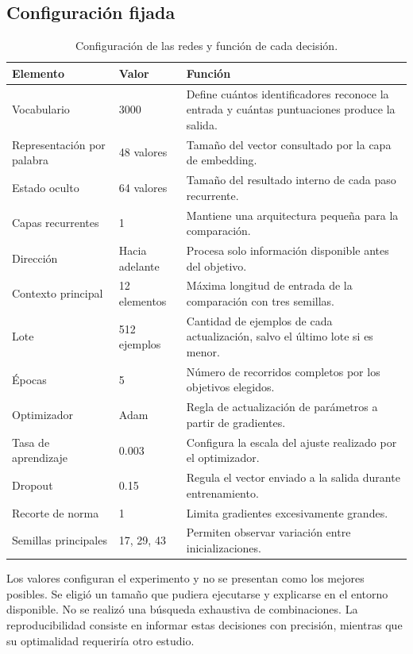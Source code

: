 \subsection{Configuración fijada}
\begin{table}[tb]
\caption{Configuración de las redes y función de cada decisión.}
\centering
\begin{tabular}{p{}p{}p{}}
\toprule Elemento & Valor & Función\\\midrule
Vocabulario & 3000 & Define cuántos identificadores reconoce la entrada y cuántas puntuaciones produce la salida.\\
Representación por palabra & 48 valores & Tamaño del vector consultado por la capa de embedding.\\
Estado oculto & 64 valores & Tamaño del resultado interno de cada paso recurrente.\\
Capas recurrentes & 1 & Mantiene una arquitectura pequeña para la comparación.\\
Dirección & Hacia adelante & Procesa solo información disponible antes del objetivo.\\
Contexto principal & 12 elementos & Máxima longitud de entrada de la comparación con tres semillas.\\
Lote & 512 ejemplos & Cantidad de ejemplos de cada actualización, salvo el último lote si es menor.\\
Épocas & 5 & Número de recorridos completos por los objetivos elegidos.\\
Optimizador & Adam & Regla de actualización de parámetros a partir de gradientes.\\
Tasa de aprendizaje & 0.003 & Configura la escala del ajuste realizado por el optimizador.\\
Dropout & 0.15 & Regula el vector enviado a la salida durante entrenamiento.\\
Recorte de norma & 1 & Limita gradientes excesivamente grandes.\\
Semillas principales & 17, 29, 43 & Permiten observar variación entre inicializaciones.\\\bottomrule
\end{tabular}
\end{table}

Los valores configuran el experimento y no se presentan como los mejores posibles. Se eligió un tamaño que pudiera ejecutarse y explicarse en el entorno disponible. No se realizó una búsqueda exhaustiva de combinaciones. La reproducibilidad consiste en informar estas decisiones con precisión, mientras que su optimalidad requeriría otro estudio.

